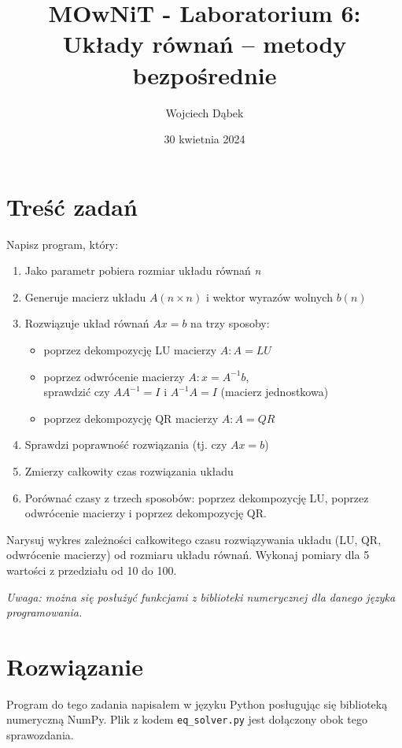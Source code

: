 \documentclass{article}
\title{MOwNiT - Laboratorium 6:\\
Układy równań – metody bezpośrednie}
\author{Wojciech Dąbek}
\date{30 kwietnia 2024}
\begin{document}
\maketitle

\section{Treść zadań}

Napisz program, który:
\begin{enumerate}
    \item Jako parametr pobiera rozmiar układu równań \textit{n}
    \item Generuje macierz układu \(A(n \times n)\) i wektor wyrazów wolnych \(b(n)\)
    \item Rozwiązuje układ równań \(Ax = b\) na trzy sposoby:
    \begin{itemize}
        \item poprzez dekompozycję LU macierzy \(A: A = LU\)
        \item poprzez odwrócenie macierzy \(A: x = A^{-1} b\),\\
        sprawdzić czy \(A A^{-1} = I\) i \(A^{-1} A = I\) (macierz jednostkowa)
        \item poprzez dekompozycję QR macierzy \(A: A = QR\)
    \end{itemize}
    \item Sprawdzi poprawność rozwiązania (tj. czy \(Ax = b\))
    \item Zmierzy całkowity czas rozwiązania układu
    \item Porównać czasy z trzech sposobów: poprzez dekompozycję LU, poprzez odwrócenie macierzy i poprzez dekompozycję QR.
\end{enumerate}

\noindent
Narysuj wykres zależności całkowitego czasu rozwiązywania układu (LU, QR, odwrócenie macierzy) od rozmiaru układu równań. Wykonaj pomiary dla 5 wartości z przedziału od 10 do 100.

\vspace{5mm}
\noindent
\textit{Uwaga: można się posłużyć funkcjami z biblioteki numerycznej dla danego języka programowania.}

\newpage

\section{Rozwiązanie}
Program do tego zadania napisałem w języku Python posługując się biblioteką numeryczną NumPy. Plik z kodem \verb|eq_solver.py| jest dołączony obok tego sprawozdania.
\end{document}
